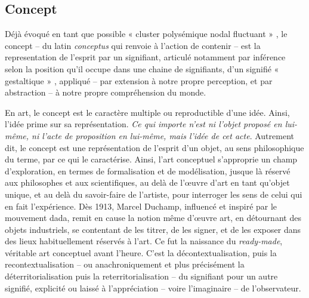 \documentclass{article}
\begin{document}

\subsection*{Concept} %
\label{concept}

Déjà évoqué en tant que possible « cluster polysémique nodal fluctuant »%
, le concept -- du latin \textit{conceptus} qui renvoie à l'action de contenir -- est la representation de l'esprit par un signifiant, articulé notamment par inférence selon la position qu’il occupe dans une chaine de signifiants, d'un signifié « gestaltique »%
, appliqué -- par extension à notre propre perception, et par abstraction -- à notre propre compréhension du monde. 

\bigskip 

En art, le concept est le caractère multiple ou reproductible d'une idée. Ainsi, l'idée prime sur sa représentation. \textit{Ce qui importe n’est ni l’objet proposé en lui-même, ni l’acte de proposition en lui-même, mais l’idée de cet acte}. Autrement dit, le concept est une représentation de l’esprit d’un objet, au sens philosophique du terme, par ce qui le caractérise.
Ainsi, l'art conceptuel s'approprie un champ d'exploration, en termes de formalisation et de modélisation, jusque là réservé aux philosophes et aux scientifiques, au delà de l'œuvre d'art en tant qu'objet unique, et au delà du savoir-faire de l'artiste, pour interroger les sens de celui qui en fait l'expérience.
Dès 1913, Marcel Duchamp, influencé et inspiré par le mouvement dada, remit en cause la notion même d'œuvre art, en détournant des objets industriels, se contentant de les titrer, de les signer, et de les exposer dans des lieux habituellement réservés à l'art. Ce fut la naissance du \textit{ready-made}, véritable art conceptuel avant l'heure. C'est la décontextualisation, puis la recontextualisation -- ou anachroniquement et plus précisément la déterritorialisation puis la reterritorialisation -- du signifiant pour un autre signifié, explicité ou laissé à l'appréciation -- voire l'imaginaire -- de l'observateur. 
\end{document}
